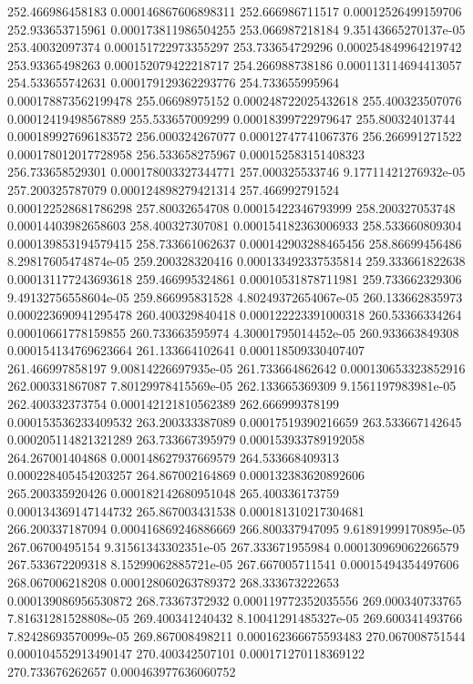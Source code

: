 {252.466986458183 0.000146867606898311
252.666986711517 0.00012526499159706
252.933653715961 0.000173811986504255
253.066987218184 9.35143665270137e-05
253.40032097374 0.000151722973355297
253.733654729296 0.000254849964219742
253.93365498263 0.000152079422218717
254.266988738186 0.000113114694413057
254.533655742631 0.000179129362293776
254.733655995964 0.000178873562199478
255.06698975152 0.000248722025432618
255.400323507076 0.00012419498567889
255.533657009299 0.00018399722979647
255.800324013744 0.000189927696183572
256.000324267077 0.00012747741067376
256.266991271522 0.000178012017728958
256.533658275967 0.000152583151408323
256.733658529301 0.000178003327344771
257.000325533746 9.17711421276932e-05
257.200325787079 0.000124898279421314
257.466992791524 0.000122528681786298
257.80032654708 0.00015422346793999
258.200327053748 0.00014403982658603
258.400327307081 0.000154182363006933
258.533660809304 0.000139853194579415
258.733661062637 0.000142903288465456
258.86699456486 8.29817605474874e-05
259.200328320416 0.000133492337535814
259.333661822638 0.000131177243693618
259.466995324861 0.00010531878711981
259.733662329306 9.49132756558604e-05
259.866995831528 4.80249372654067e-05
260.133662835973 0.000223690941295478
260.400329840418 0.000122223391000318
260.53366334264 0.00010661778159855
260.733663595974 4.30001795014452e-05
260.933663849308 0.000154134769623664
261.133664102641 0.000118509330407407
261.466997858197 9.00814226697935e-05
261.733664862642 0.000130653323852916
262.000331867087 7.80129978415569e-05
262.133665369309 9.1561197983981e-05
262.400332373754 0.000142121810562389
262.666999378199 0.000153536233409532
263.200333387089 0.00017519390216659
263.533667142645 0.000205114821321289
263.733667395979 0.000153933789192058
264.267001404868 0.000148627937669579
264.533668409313 0.000228405454203257
264.867002164869 0.000132383620892606
265.200335920426 0.000182142680951048
265.400336173759 0.000134369147144732
265.867003431538 0.000181310217304681
266.200337187094 0.000416869246886669
266.800337947095 9.61891999170895e-05
267.06700495154 9.31561343302351e-05
267.333671955984 0.000130969062266579
267.533672209318 8.15299062885721e-05
267.667005711541 0.00015494354497606
268.067006218208 0.000128060263789372
268.333673222653 0.000139086956530872
268.73367372932 0.000119772352035556
269.000340733765 7.81631281528808e-05
269.400341240432 8.10041291485327e-05
269.600341493766 7.82428693570099e-05
269.867008498211 0.000162366675593483
270.067008751544 0.000104552913490147
270.400342507101 0.000171270118369122
270.733676262657 0.000463977636060752
}
